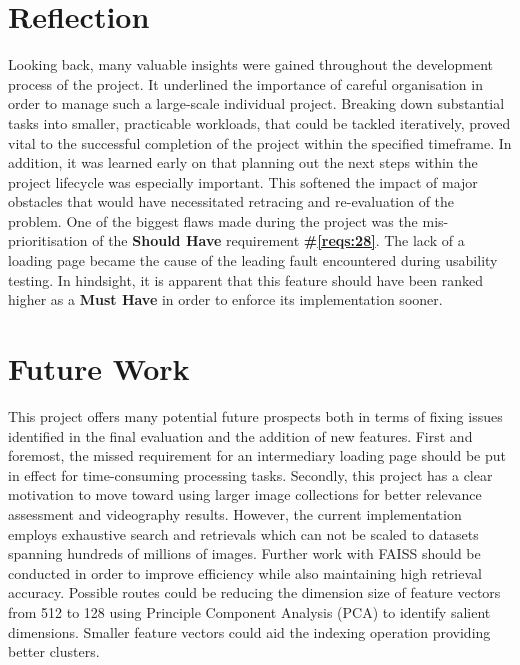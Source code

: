 \documentclass{l4proj}
\begin{document}
\section{Reflection}
Looking back, many valuable insights were gained throughout the development process of the project. It underlined the importance of careful organisation in order to manage such a large-scale individual project. Breaking down substantial tasks into smaller, practicable workloads, that could be tackled iteratively, proved vital to the successful completion of the project within the specified timeframe. In addition, it was learned early on that planning out the next steps within the project lifecycle was especially important. This softened the impact of major obstacles that would have necessitated retracing and re-evaluation of the problem. One of the biggest flaws made during the project was the mis-prioritisation of the \textbf{Should Have} requirement \textbf{\#\ref{reqs:28}}. The lack of a loading page became the cause of the leading fault encountered during usability testing. In hindsight, it is apparent that this feature should have been ranked higher as a \textbf{Must Have} in order to enforce its implementation sooner.


\section{Future Work}
\label{sec:future_work}
This project offers many potential future prospects both in terms of fixing issues identified in the final evaluation and the addition of new features. First and foremost, the missed requirement for an intermediary loading page should be put in effect for time-consuming processing tasks. Secondly, this project has a clear motivation to move toward using larger image collections for better relevance assessment and videography results. However, the current implementation employs exhaustive search and retrievals which can not be scaled to datasets spanning hundreds of millions of images. Further work with FAISS should be conducted in order to improve efficiency while also maintaining high retrieval accuracy. Possible routes could be reducing the dimension size of feature vectors from 512 to 128 using Principle Component Analysis (PCA) to identify salient dimensions. Smaller feature vectors could aid the indexing operation providing better clusters.
\end{document}
